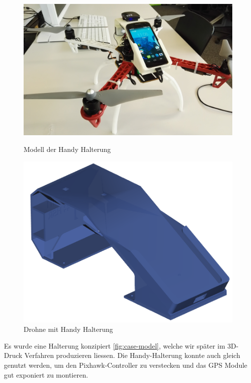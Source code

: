 \begin{figure}[H]
	\centering
	\begin{minipage}[b]{0.4\textwidth}
		\includegraphics[width=\textwidth]{images/hardware/drone-with-handy.jpg}
	\caption{Modell der Handy Halterung}
	\label{fig:case-model}
	\end{minipage}
	\hfill
	\begin{minipage}[b]{0.4\textwidth}
		\includegraphics[width=\textwidth]{images/hardware/case-model.png}
	\caption{Drohne mit Handy Halterung}
	\label{fig:prototyp-3}
	\end{minipage}
\end{figure}

Es wurde eine Halterung konzipiert \ref{fig:case-model}, welche wir später im 3D-Druck Verfahren produzieren liessen.
Die Handy-Halterung konnte auch gleich genutzt werden, um den Pixhawk-Controller zu verstecken und das GPS Module gut exponiert zu montieren. 


